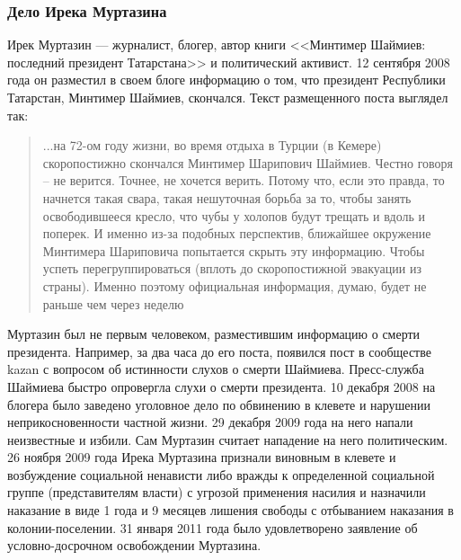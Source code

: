 \subsubsection{Дело Ирека Муртазина}
Ирек Муртазин --- журналист, блогер, автор книги <<Минтимер Шаймиев: последний президент Татарстана>> и политический активист. 12 сентября 2008 года он разместил в своем блоге информацию о том, что президент Республики Татарстан, Минтимер Шаймиев, скончался. Текст размещенного поста выглядел так\cite{murtazin_post}:
\begin{quote}...на 72-ом году жизни, во время отдыха в Турции (в  Кемере) скоропостижно скончался Минтимер Шарипович Шаймиев.
Честно говоря – не верится. Точнее, не хочется верить. Потому что, если это правда, то начнется такая свара, такая нешуточная борьба за то, чтобы занять освободившееся кресло, что чубы у холопов будут трещать и вдоль и поперек. И именно из-за подобных перспектив, ближайшее окружение Минтимера Шариповича попытается скрыть эту информацию. Чтобы успеть перегруппироваться (вплоть до скоропостижной эвакуации из страны). Именно поэтому официальная информация, думаю, будет не раньше чем через неделю\end{quote}
Муртазин был не первым человеком, разместившим информацию о смерти 
президента. Например, за два часа до его поста, появился пост в сообществе kazan с вопросом об истинности слухов о смерти Шаймиева\cite{murtazin_later}. Пресс-служба Шаймиева быстро опровергла слухи о смерти президента\cite{murtazin_alive}. 10 декабря 2008 на блогера было заведено уголовное дело по обвинению в клевете и нарушении неприкосновенности частной жизни\cite{murtazin_delo}. 29 декабря 2009 года на него напали неизвестные и избили\cite{murtazin_beat}. Сам Муртазин считает нападение на него политическим\cite{murtazin_political}. 26 ноября 2009 года Ирека Муртазина признали виновным в клевете и возбуждение социальной ненависти либо вражды к определенной социальной группе (представителям власти\cite{murtazin_group}) с угрозой применения насилия и назначили наказание в виде 1 года и 9 месяцев лишения свободы с отбыванием наказания в колонии-поселении\cite{murtazin_court}. 31 января 2011 года было удовлетворено заявление об условно-досрочном освобождении Муртазина\cite{murtazin_free}.
